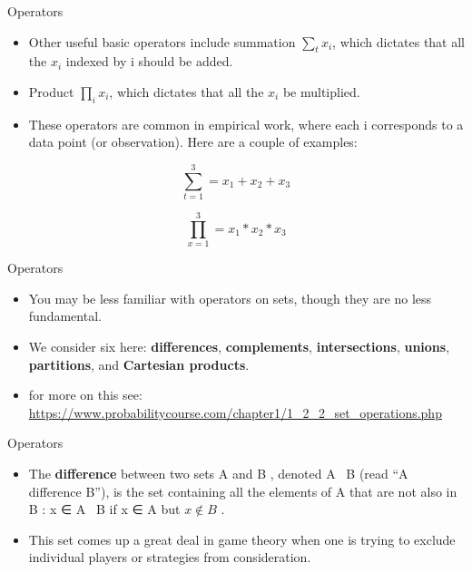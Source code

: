 \documentclass[
  ignorenonframetext,
]{beamer}
\begin{document}
\begin{frame}{Operators}
\protect\hypertarget{operators-1}{}

\begin{itemize}
\item
  Other useful basic operators include summation \(\sum_{t} x_{i}\),
  which dictates that all the \(x_{i}\) indexed by i should be added.
\item
  Product \(\prod_{i} x_{i}\), which dictates that all the \(x_{i}\) be
  multiplied.
\item
  These operators are common in empirical work, where each i corresponds
  to a data point (or observation). Here are a couple of examples:
\end{itemize}

\[\sum_{t = 1}^{3} = x_{1} +  x_{2} +  x_{3} \]

\[\prod_{x = 1}^{3} = x_{1}*x_{2}*x_{3} \]

\end{frame}

\begin{frame}{Operators}
\protect\hypertarget{operators-2}{}

\begin{itemize}
\item
  You may be less familiar with operators on sets, though they are no
  less fundamental.
\item
  We consider six here: \textbf{differences}, \textbf{complements},
  \textbf{intersections}, \textbf{unions}, \textbf{partitions}, and
  \textbf{Cartesian products}.
\item
  for more on this see:
  \url{https://www.probabilitycourse.com/chapter1/1_2_2_set_operations.php}
\end{itemize}

\end{frame}

\begin{frame}{Operators}
\protect\hypertarget{operators-3}{}

\begin{itemize}
\item
  The \textbf{difference} between two sets A and B , denoted A ~B (read
  ``A difference B''), is the set containing all the elements of A that
  are not also in B : x ∈ A ~B if x ∈ A but \(x \notin B\) .
\item
  This set comes up a great deal in game theory when one is trying to
  exclude individual players or strategies from consideration.
\end{itemize}

\end{frame}
\end{document}
